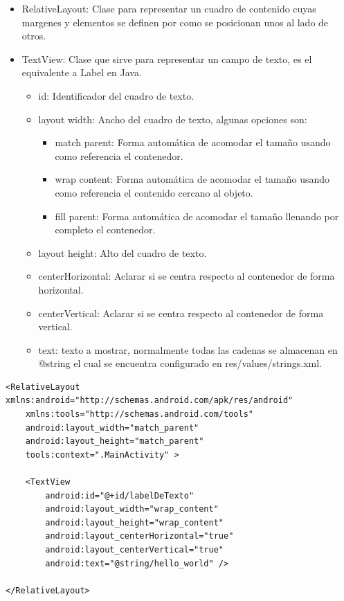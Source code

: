 \documentclass[11pt]{book}
\begin{document}
\begin{itemize}
\item RelativeLayout: Clase para representar un cuadro de contenido cuyas margenes y elementos se definen por como se posicionan unos al lado de otros.
\item TextView: Clase que sirve para representar un campo de texto, es el equivalente a Label en Java.
	\begin{itemize}
	\item id: Identificador del cuadro de texto.
	\item layout width: Ancho del cuadro de texto, algunas opciones son:
		\begin{itemize}
		\item match parent: Forma automática de acomodar el tamaño usando como referencia el contenedor.
		\item wrap content: Forma automática de acomodar el tamaño usando como referencia el contenido cercano al objeto.
		\item fill parent: Forma automática de acomodar el tamaño llenando por completo el contenedor.
		\end{itemize}
	\item layout height: Alto del cuadro de texto.
	\item centerHorizontal: Aclarar si se centra respecto al contenedor de forma horizontal.
	\item centerVertical: Aclarar si se centra respecto al contenedor de forma vertical.
	\item text: texto a mostrar, normalmente todas las cadenas se almacenan en @string el cual se encuentra configurado en res/values/strings.xml.
	\end{itemize}
\end{itemize}

\begin{lstlisting}
<RelativeLayout xmlns:android="http://schemas.android.com/apk/res/android"
    xmlns:tools="http://schemas.android.com/tools"
    android:layout_width="match_parent"
    android:layout_height="match_parent"
    tools:context=".MainActivity" >

    <TextView
        android:id="@+id/labelDeTexto"
        android:layout_width="wrap_content"
        android:layout_height="wrap_content"
        android:layout_centerHorizontal="true"
        android:layout_centerVertical="true"
        android:text="@string/hello_world" />

</RelativeLayout>
\end{lstlisting}
\end{document}

